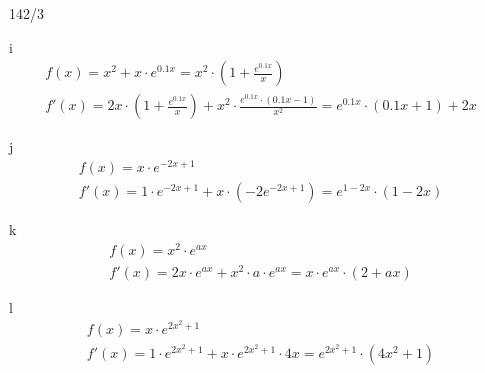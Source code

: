 \begin{exercise}{142/3}
  \item [i]
  \begin{gather*}
    f(x) = x^2 + x \cdot e^{0.1x} = x^2 \cdot (1 + \frac{e^{0.1x}}{x}) \\
    f'(x) = 2x \cdot (1 + \frac{e^{0.1x}}{x}) + x^2 \cdot \frac{e^{0.1x} \cdot (0.1x - 1)}{x^2} = e^{0.1x} \cdot (0.1x + 1) + 2x
  \end{gather*}
  \item [j]
  \begin{gather*}
    f(x) = x \cdot e^{-2x + 1} \\
    f'(x) = 1 \cdot e^{-2x + 1} + x \cdot (-2e^{-2x + 1}) = e^{1 - 2x} \cdot (1 - 2x)
  \end{gather*}
  \item [k]
  \begin{gather*}
    f(x) = x^2 \cdot e^{ax} \\
    f'(x) = 2x \cdot e^{ax} + x^2 \cdot a \cdot e^{ax} = x \cdot e^{ax} \cdot (2 + ax)
  \end{gather*}
  \item [l]
  \begin{gather*}
    f(x) = x \cdot e^{2x^2 + 1} \\
    f'(x) = 1 \cdot e^{2x^2 + 1} + x \cdot e^{2x^2 + 1} \cdot 4x = e^{2x^2 + 1} \cdot (4x^2 + 1)
  \end{gather*}
\end{exercise}
